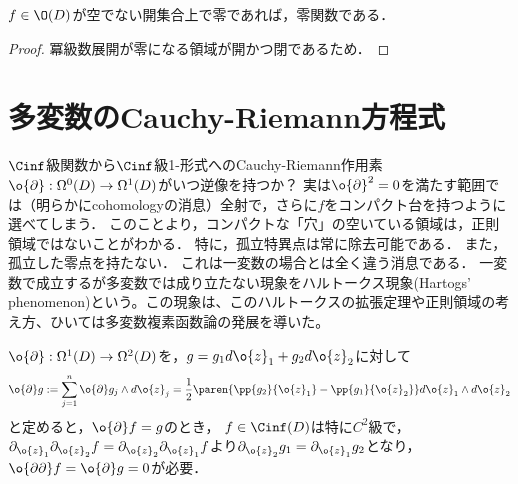 \documentclass[uplatex, dvipdfmx]{jsreport}
\begin{document}
\begin{theorem}[一致の定理]\label{thm-identity-multivariable}
    $f\in\O(D)$が空でない開集合上で零であれば，零関数である．
\end{theorem}
\begin{proof}
    冪級数展開が零になる領域が開かつ閉であるため．
\end{proof}

\section{多変数のCauchy-Riemann方程式}

\begin{tcolorbox}[colframe=ForestGreen, colback=ForestGreen!10!white,breakable,colbacktitle=ForestGreen!40!white,coltitle=black,fonttitle=\bfseries\sffamily,
title=一変数と多変数で違うところ：Hartogs現象]
    $\Cinf$級関数から$\Cinf$級1-形式へのCauchy-Riemann作用素$\o{\partial}:\Omega^0(D)\to\Omega^1(D)$がいつ逆像を持つか？
    実は$\o{\partial}^2=0$を満たす範囲では（明らかにcohomologyの消息）全射で，さらに$f$をコンパクト台を持つように選べてしまう．
    このことより，コンパクトな「穴」の空いている領域は，正則領域ではないことがわかる．
    特に，孤立特異点は常に除去可能である．
    また，孤立した零点を持たない．
    これは一変数の場合とは全く違う消息である．
    一変数で成立するが多変数では成り立たない現象をハルトークス現象(Hartogs' phenomenon)という。この現象は、このハルトークスの拡張定理や正則領域の考え方、ひいては多変数複素函数論の発展を導いた。
\end{tcolorbox}

\begin{discussion}\label{discussion-CR-operator-in-mulivariable}
    $\o{\partial}:\Omega^1(D)\to\Omega^2(D)$を，$g=g_1d\o{z}_1+g_2d\o{z}_2$に対して
    \[\o{\partial}g:=\sum_{j=1}^n\o{\partial}g_j\wedge d\o{z}_j=\frac{1}{2}\paren{\pp{g_2}{\o{z}_1}-\pp{g_1}{\o{z}_2}}d\o{z}_1\wedge d\o{z}_2\]
    と定めると，$\o{\partial}f=g$のとき，
    $f\in\Cinf(D)$は特に$C^2$級で，
    $\partial_{\o{z}_1}\partial_{\o{z}_2}f=\partial_{\o{z}_2}\partial_{\o{z}_1}f$より$\partial_{\o{z}_2}g_1=\partial_{\o{z}_1}g_2$となり，$\o{\partial\partial}f=\o{\partial}g=0$が必要．
\end{discussion}
\end{document}
